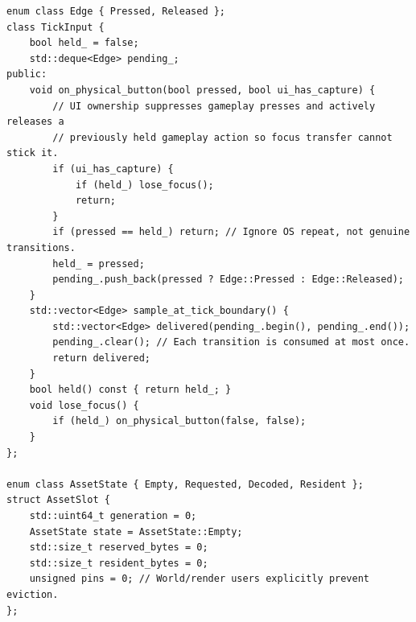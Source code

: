 \begin{verbatim}
enum class Edge { Pressed, Released };
class TickInput {
    bool held_ = false;
    std::deque<Edge> pending_;
public:
    void on_physical_button(bool pressed, bool ui_has_capture) {
        // UI ownership suppresses gameplay presses and actively releases a
        // previously held gameplay action so focus transfer cannot stick it.
        if (ui_has_capture) {
            if (held_) lose_focus();
            return;
        }
        if (pressed == held_) return; // Ignore OS repeat, not genuine transitions.
        held_ = pressed;
        pending_.push_back(pressed ? Edge::Pressed : Edge::Released);
    }
    std::vector<Edge> sample_at_tick_boundary() {
        std::vector<Edge> delivered(pending_.begin(), pending_.end());
        pending_.clear(); // Each transition is consumed at most once.
        return delivered;
    }
    bool held() const { return held_; }
    void lose_focus() {
        if (held_) on_physical_button(false, false);
    }
};

enum class AssetState { Empty, Requested, Decoded, Resident };
struct AssetSlot {
    std::uint64_t generation = 0;
    AssetState state = AssetState::Empty;
    std::size_t reserved_bytes = 0;
    std::size_t resident_bytes = 0;
    unsigned pins = 0; // World/render users explicitly prevent eviction.
};


\end{verbatim}
